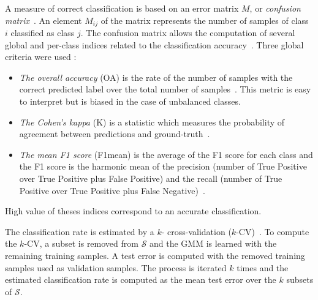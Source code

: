 \documentclass[journal,peerreview,onecolumn]{IEEEtran}
\begin{document}
        A measure of correct classification is based on an error matrix $M$, or \emph{confusion matrix}~\cite[Chapter 4]{congalton2008assessing}. An element $M_{ij}$ of the matrix represents the number of samples of class $i$ classified as class $j$. The confusion matrix allows the computation of several global and per-class indices related to the classification accuracy~\cite{congalton2008assessing}. Three global criteria were used :
        \begin{itemize}
        \item  \emph{The overall  accuracy} (OA)  is the  rate of  the
          number of samples with the  correct predicted label over the
          total  number of  samples~\cite{congalton2008assessing}. This
          metric is  easy to interpret  but is  biased in the  case of
          unbalanced classes.

        \item \emph{The Cohen's kappa} (K) is a statistic which measures the probability of agreement between predictions and ground-truth~\cite{congalton2008assessing}.

        \item \emph{The mean F1 score}  (F1mean) is the average of the
          F1 score  for each class  and the  F1 score is  the harmonic
          mean of  the precision  (number of  True Positive  over True
          Positive plus False Positive) and the recall (number of True
          Positive over True Positive plus False Negative)~\cite{powers2011evaluation}.
        \end{itemize}
        High  value  of  theses  indices  correspond  to  an  accurate
        classification.
      
      The classification rate is  estimated by a $k$- cross-validation
      ($k$-CV)~\cite{opac-b1127878}.  To compute  the $k$-CV, a subset
      is removed  from $\mathcal{S}$ and  the GMM is learned  with the
      remaining training samples.   A test error is  computed with the
      removed  training  samples  used  as  validation  samples.   The
      process is  iterated $k$ times and  the estimated classification
      rate is computed as the mean  test error over the $k$ subsets of
      $\mathcal{S}$.

        \hspace{0pt} \\
\end{document}
